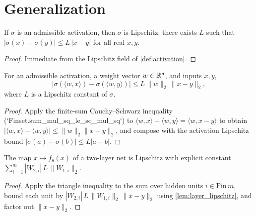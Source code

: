 \chapter{Generalization}

\begin{lemma}\label{lem:lipschitz_gelu}
\leanok
{}
If $\sigma$ is an admissible activation, then $\sigma$ is Lipschitz: there exists $L$ such that $|\sigma(x)-\sigma(y)|\le L\,|x-y|$ for all real $x,y$.
\end{lemma}
\begin{proof}
\leanok
Immediate from the Lipschitz field of \cref{def:activation}.
\end{proof}

\begin{lemma}\label{lem:layer_lipschitz}
\leanok
{}
For an admissible activation, a weight vector $w\in\mathbb{R}^d$, and inputs $x,y$,
\[
\bigl|\sigma(\langle w,x\rangle)-\sigma(\langle w,y\rangle)\bigr|
\le L\,\|w\|_2\,\|x-y\|_2,
\]
where $L$ is a Lipschitz constant of $\sigma$.
\end{lemma}
\begin{proof}
\leanok
Apply the finite-sum Cauchy--Schwarz inequality (`Finset.sum_mul_sq_le_sq_mul_sq`) to $\langle w, x\rangle - \langle w, y\rangle = \langle w, x-y\rangle$ to obtain $|\langle w,x\rangle - \langle w,y\rangle| \le \|w\|_2\|x-y\|_2$, and compose with the activation Lipschitz bound $|\sigma(a)-\sigma(b)|\le L|a-b|$.
\end{proof}

\begin{lemma}\label{lem:forward_lipschitz}
\leanok
{}
The map $x\mapsto f_\theta(x)$ of a two-layer net is Lipschitz with explicit constant $\sum_{i=1}^m |W_{2,i}|\,L\,\|W_{1,i}\|_2$.
\end{lemma}
\begin{proof}
\leanok
Apply the triangle inequality to the sum over hidden units $i\in\mathrm{Fin}\,m$, bound each unit by $|W_{2,i}|\,L\,\|W_{1,i}\|_2\,\|x-y\|_2$ using \cref{lem:layer_lipschitz}, and factor out $\|x-y\|_2$.
\end{proof}

